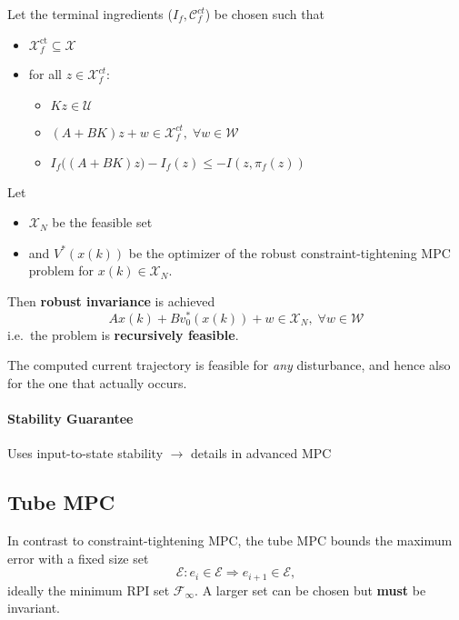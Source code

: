 Let the terminal ingredients ($I_f, \mathcal{C}_f^{ct}$) be chosen such that
\begin{itemize}
    \item $\mathcal{X}_f^{\mathrm{ct}}\subseteq \mathcal{X}$
    \item for all $z\in \mathcal{X}_f^{ct}$:
          \begin{itemize}
              \item $Kz \in \mathcal{U}$
              \item $(A+BK) z + w \in \mathcal{X}_f^{ct}, \; \forall w \in \mathcal{W}$
              \item $I_f\bigl((A+BK)z\bigr) - I_f(z) \leq -I(z, \pi_f(z))$
          \end{itemize}
\end{itemize}
\newpar{}
Let
\begin{itemize}
    \item $\mathcal{X}_N$ be the feasible set
    \item and $V^*(x(k))$ be the optimizer of the robust constraint-tightening MPC problem for $x(k)\in\mathcal{X}_N$.
\end{itemize}
\newpar{}
Then \textbf{robust invariance} is achieved
\begin{equation*}
    Ax(k) + Bv_0^*(x(k)) + w \in \mathcal{X}_N, \; \forall w \in \mathcal{W}
\end{equation*}
i.e.\ the problem is \textbf{recursively feasible}.
\newpar{}

The computed current trajectory is feasible for \textit{any} disturbance, and hence also for the one that actually occurs.

\paragraph{Stability Guarantee}
Uses input-to-state stability $\rightarrow$ details in advanced MPC

\subsection{Tube MPC}
In contrast to constraint-tightening MPC, the tube MPC bounds the maximum error with a fixed size set
\begin{equation*}
    \mathcal{E}:e_i \in \mathcal{E} \Rightarrow e_{i+1}\in \mathcal{E},
\end{equation*}
ideally the minimum RPI set $\mathcal{F}_\infty$. A larger set can be chosen but \textbf{must} be invariant.

